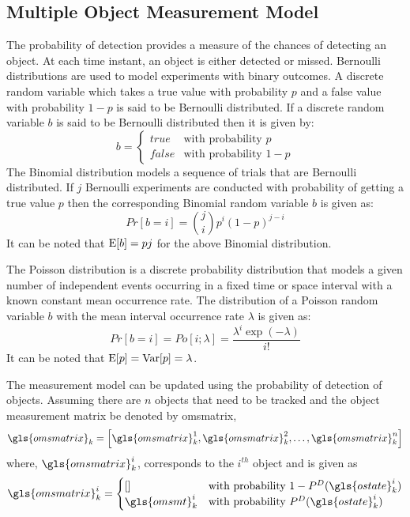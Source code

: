\documentclass[a4paper]{article}
\begin{document}
\subsection{Multiple Object Measurement Model}
The probability of detection provides a measure of the chances of detecting an object. At each time instant, an object is either detected or missed. Bernoulli distributions are used to model experiments with binary outcomes. A discrete random variable which takes a true value with probability $p$ and a false value with probability $1-p$ is said to be Bernoulli distributed. If a discrete random variable $b$ is said to be Bernoulli distributed then it is given by:
\begin{equation}
	b=\begin{cases}
		true &\text{with probability $p$}\\
		false &\text{with probability $1-p$}
	\end{cases}
\end{equation}
The Binomial distribution models a sequence of trials that are Bernoulli distributed. If $j$ Bernoulli experiments are conducted with probability of getting a true value $p$ then the corresponding Binomial random variable $b$ is given as:
\begin{equation}
	Pr[b=i]=\binom{j}{i}p^i(1-p)^{j-i}
\end{equation}
It can be noted that $\operatorname{E}[b]=pj$ for the above Binomial distribution.\par
The Poisson distribution is a discrete probability distribution that models a given number of independent events occurring in a fixed time or space interval with a known constant mean occurrence rate. The distribution of a Poisson random variable $b$ with the mean interval occurrence rate $\lambda$ is given as:
\begin{equation}
	Pr[b=i]=Po[i;\lambda]=\dfrac{\lambda^i\exp(-\lambda)}{i!}
\end{equation}
It can be noted that $\operatorname{E}[p]=\operatorname{Var}[p]=\lambda$.\par%
The measurement model can be updated using the probability of detection of objects. Assuming there are $n$ objects that need to be tracked and the object measurement matrix be denoted by \gls{omsmatrix},
\begin{equation}
	\gls{omsmatrix}_k=\left[\gls{omsmatrix}_k^1,\gls{omsmatrix}_k^2,\dots,\gls{omsmatrix}_k^n\right]
\end{equation}
where, $\gls{omsmatrix}_k^i$, corresponds to the $i^{th}$ object and is given as
\begin{equation}
	\gls{omsmatrix}_k^i=\begin{cases}
		[] &\text{with probability }1-P^D(\gls{ostate}_k^i)\\
		\gls{omsmt}_k^i &\text{with probability }P^D(\gls{ostate}_k^i)
	\end{cases}
\end{equation}
\end{document}
